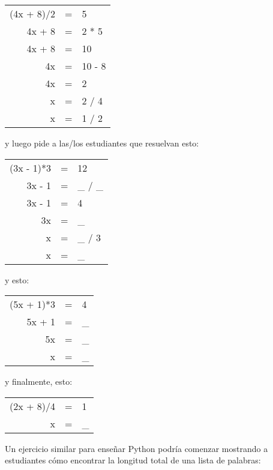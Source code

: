 \begin{center}
\begin{tabular}{rcl}
  (4x + 8)/2    & = &    5    \\
  4x + 8    & = &    2 * 5    \\
  4x + 8    & = &    10    \\
  4x        & = &    10 - 8    \\
  4x        & = &    2    \\
  x        & = &    2 / 4    \\
  x        & = &    1 / 2
\end{tabular}
\end{center}

\noindent
y luego pide a las/los estudiantes que resuelvan esto:

\begin{center}
\begin{tabular}{rcl}
  (3x - 1)*3    & = &    12    \\
  3x - 1    & = &    \_ / \_    \\
  3x - 1    & = &    4    \\
  3x        & = &    \_    \\
  x        & = &    \_ / 3    \\
  x        & = &    \_
\end{tabular}
\end{center}

\noindent
y esto:

\begin{center}
\begin{tabular}{rcl}
  (5x + 1)*3    & = &    4    \\
  5x + 1    & = &    \_     \\
  5x        & = &    \_     \\
  x        & = &    \_
\end{tabular}
\end{center}

\noindent
y finalmente, esto:

\begin{center}
\begin{tabular}{rcl}
  (2x + 8)/4    & = &    1    \\
   x        & = &    \_
\end{tabular}
\end{center}

Un ejercicio similar para enseñar Python podría comenzar mostrando a estudiantes
cómo encontrar la longitud total de una lista de palabras:

